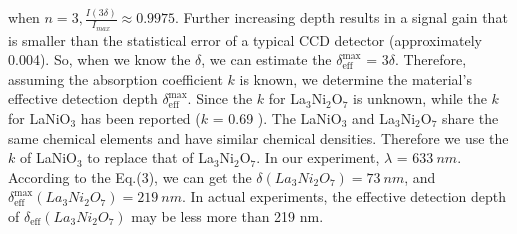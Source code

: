 \documentclass[prx,aps,twocolumn,preprintnumbers,amsmath,amssymb,superscriptaddress,showpacs]{revtex4-2}
\begin{document}
when $n=3 ,\frac{I(3 \delta)}{I_{max}}\approx0.9975$. Further increasing depth results in a signal gain that is smaller than the statistical error of a typical CCD detector (approximately 0.004). So, when we know the  $\delta$, we can estimate the $\delta_{\text{eff}}^{\text{max}}$ = $3 \delta$. Therefore, assuming the absorption coefficient $k$ is known, we determine the material's effective detection depth $\delta_{\text{eff}}^{\text{max}}$. Since the  $k$  for La$_3$Ni$_2$O$_7$ is unknown, while the  $k$  for LaNiO$_3$ has been reported ($k$ = 0.69 )\cite{2001Ultraviolet}. The LaNiO$_3$ and La$_3$Ni$_2$O$_7$ share the same chemical elements and have similar chemical densities. Therefore we use the $k$  of  LaNiO$_3$ to replace that of La$_3$Ni$_2$O$_7$. In our experiment, $\lambda$ = $ 633\ nm$.  According to the Eq.(3), we can get the  $\delta( La_3Ni_2O_7)=73\ nm$, and $\delta_{\text{eff}}^{\text{max}}(  La_3Ni_2O_7) =219\ nm$. In actual experiments, the effective detection depth of $\delta_{\text{eff}}(  La_3Ni_2O_7)$ may be less more than 219 nm.
\end{document}

